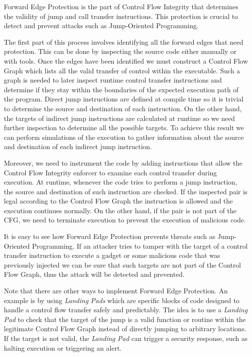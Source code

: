 Forward Edge Protection is the part of Control Flow Integrity that determines the
validity of jump and call transfer instructions. This protection is crucial to
detect and prevent attacks such as Jump-Oriented Programming.

The first part of this process involves identifying all the forward edges that
need protection. This can be done by inspecting the source code either manually or
with tools. Once the edges have been identified we must construct a Control Flow
Graph which lists all the valid transfer of control within the executable. Such a
graph is needed to later inspect runtime control transfer instructions and determine
if they stay within the boundaries of the expected execution path of the program.
Direct jump instructions are defined at compile time so it is trivial to
determine the source and destination of each instruction. On the other hand, the
targets of indirect jump instructions are calculated at runtime so we need
further inspection to determine all the possible targets. To achieve this result
we can perform simulations of the execution to gather information about the source
and destination of each indirect jump instruction.

Moreover, we need to instrument the code by adding instructions that allow the
Control Flow Integrity enforcer to examine each control transfer during
execution. At runtime, whenever the code tries to perform a jump instruction, the
source and destination of such instruction are checked. If the inspected pair is
legal according to the Control Flow Graph the instruction is allowed and the
execution continues normally. On the other hand, if the pair is not part of the
CFG, we need to terminate execution to prevent the execution of malicious code.

It is easy to see how Forward Edge Protection prevents threats such as Jump-Oriented
Programming. If an attacker tries to tamper with the target of a control
transfer instruction to execute a gadget or some malicious code that was
previously injected we can be sure that such targets are not part of the Control
Flow Graph, thus the attack will be detected and prevented.

Note that there are other ways to implement Forward Edge Protection. An example
is by using \textit{Landing Pads} which are specific blocks of code designed to handle
a control flow transfer safely and predictably. The idea is to use a \textit{Landing
Pad} to check that the target of the jump is a valid function or routine within the
legitimate Control Flow Graph instead of directly jumping to arbitrary locations.
If the target is not valid, the \textit{Landing Pad} can trigger a security
response, such as halting execution or triggering an alert.

